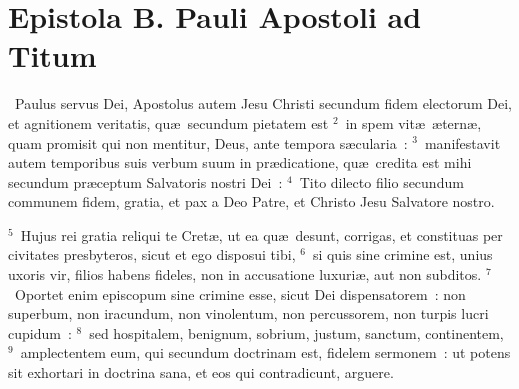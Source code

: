 \clearpage
{\centering \section*{Epistola B. Pauli Apostoli ad Titum}}\thispagestyle{empty}

~Paulus servus Dei, Apostolus autem Jesu Christi secundum fidem electorum Dei, et agnitionem veritatis, qu\ae\ secundum pietatem est
${}^{2}$~in spem vit\ae\ \ae tern\ae , quam promisit qui non mentitur, Deus, ante tempora s\ae cularia~:
${}^{3}$~manifestavit autem temporibus suis verbum suum in pr\ae dicatione, qu\ae\ credita est mihi secundum pr\ae ceptum Salvatoris nostri Dei~:
${}^{4}$~Tito dilecto filio secundum communem fidem, gratia, et pax a Deo Patre, et Christo Jesu Salvatore nostro.


${}^{5}$~Hujus rei gratia reliqui te Cret\ae , ut ea qu\ae\ desunt, corrigas, et constituas per civitates presbyteros, sicut et ego disposui tibi,
${}^{6}$~si quis sine crimine est, unius uxoris vir, filios habens fideles, non in accusatione luxuri\ae , aut non subditos.
${}^{7}$~Oportet enim episcopum sine crimine esse, sicut Dei dispensatorem~: non superbum, non iracundum, non vinolentum, non percussorem, non turpis lucri cupidum~:
${}^{8}$~sed hospitalem, benignum, sobrium, justum, sanctum, continentem,
${}^{9}$~amplectentem eum, qui secundum doctrinam est, fidelem sermonem~: ut potens sit exhortari in doctrina sana, et eos qui contradicunt, arguere.



